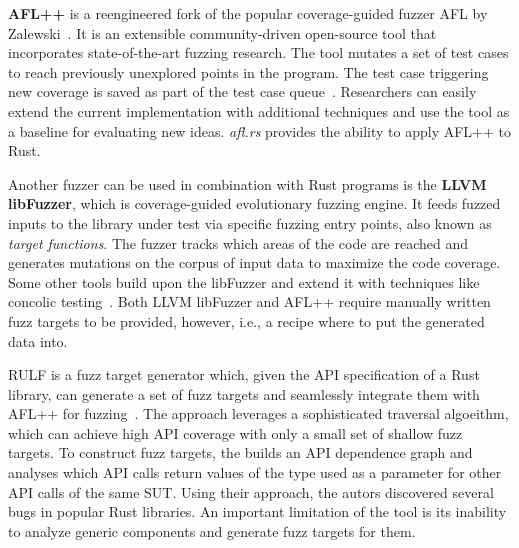 \documentclass[paper=a4,%
  twoside,%
  BCOR4mm,%
  abstract=true,%
  toc=bibliography,%
  chapterprefix=true,%
  toc=bibliographynumbered,%
  open=right,%
  english,%
  pagesize=pdftex]{scrreprt}
\begin{document}
\textbf{AFL++} is a reengineered fork of the popular coverage-guided fuzzer \textsc{AFL} by Zalewski~\cite{Zalewski2014}. It is an extensible community-driven open-source tool that incorporates state-of-the-art fuzzing research. The tool mutates a set of test cases to reach previously unexplored points in the program. The test case triggering new coverage is saved as part of the test case queue~\cite{Fioraldi2020}. Researchers can easily extend the current implementation with additional techniques and use the tool as a baseline for evaluating new ideas. \textit{afl.rs} provides the ability to apply \textsc{AFL++} to Rust.

Another fuzzer can be used in combination with Rust programs is the \textbf{LLVM libFuzzer}, which is coverage-guided evolutionary fuzzing engine. It feeds fuzzed inputs to the library under test via specific fuzzing entry points, also known as \textit{target functions}. The fuzzer tracks which areas of the code are reached and generates mutations on the corpus of input data to maximize the code coverage. Some other tools build upon the libFuzzer and extend it with techniques like concolic testing~\cite{Rocha2020,Le2019}. Both LLVM libFuzzer and \textsc{AFL++} require manually written fuzz targets to be provided, however, i.e., a recipe where to put the generated data into.

\textsc{RULF} is a fuzz target generator which, given the \ac{API} specification of a Rust library, can generate a set of fuzz targets and seamlessly integrate them with \textsc{AFL++} for fuzzing~\cite{Jiang2021}. The approach leverages a sophisticated traversal algoeithm, which can achieve high \ac{API} coverage with only a small set of shallow fuzz targets. To construct fuzz targets, the builds an \ac{API} dependence graph and analyses which \ac{API} calls return values of the type used as a parameter for other \ac{API} calls of the same \ac{SUT}. Using their approach, the autors discovered several bugs in popular Rust libraries. An important limitation of the tool is its inability to analyze generic components and generate fuzz targets for them.
\end{document}
